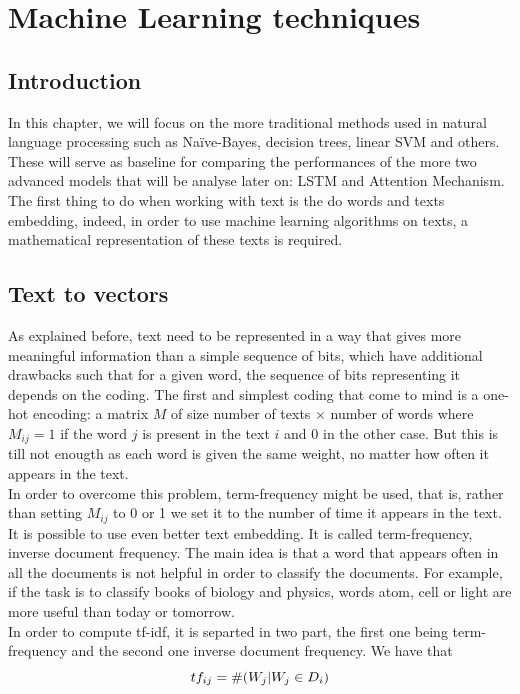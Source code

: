 \chapter{Machine Learning techniques} \label{chap3}
\section{Introduction}
In this chapter, we will focus on the more traditional methods used in natural language processing such as Naïve-Bayes, decision trees, linear SVM and others. These will serve as baseline for comparing the performances of the more two advanced models that will be analyse later on: LSTM and Attention Mechanism. The first thing to do when working with text is the do words and texts embedding, indeed, in order to use machine learning algorithms on texts, a mathematical representation of these texts is required. 

\section{Text to vectors}
As explained before, text need to be represented in a way that gives more meaningful information than a simple sequence of bits, which have additional drawbacks such that for a given word, the sequence of bits representing it depends on the coding.
 The first and simplest coding that come to mind is a one-hot encoding: a matrix $M$ of size number of texts $\times$ number of words where $M_{ij} = 1$ if the word $j$ is present in the text  $i$ and $0$ in the other case. But this is till not enougth as each word is given the same weight, no matter how often it appears in the text. \\ 

 In order to overcome this problem, term-frequency might be used, that is, rather than setting $M_{ij}$ to 0 or 1 we set it to the number of time it appears in the text. \\ 

 It is possible to use even better text embedding. It is called term-frequency, inverse document frequency. The main idea is that a word that appears often in all the documents is not helpful in order to classify the documents. For example, if the task is to classify books of biology and physics, words atom, cell or light are more useful than today or tomorrow. \\

In order to compute tf-idf, it is separted in two part, the first one being term-frequency and the second one inverse document frequency. We have that \begin{equation}
	tf_{ij} = \#(W_j | W_j \in D_i)\\ 
\end{equation}

